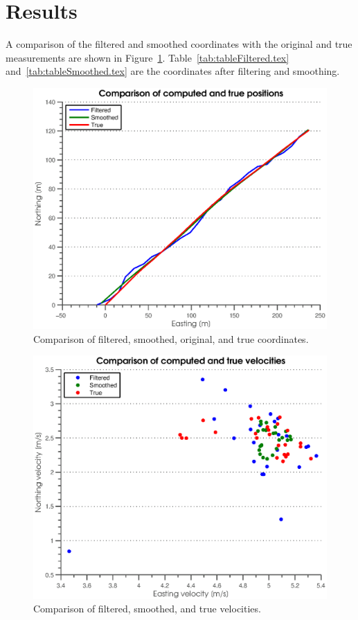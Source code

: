 

\section{Results} %
\label{sec:results}
A comparison of the filtered and smoothed coordinates with the original and true measurements are shown in Figure~\ref{fig:Figures_xDataPlots}. Table~\ref{tab:tableFiltered.tex} and~\ref{tab:tableSmoothed.tex} are the coordinates after filtering and smoothing.
\begin{figure}[htbp]
	\centering
		\includegraphics[width=\MyWidth]{Figures/xDataPlots.eps}
	\caption{Comparison of filtered, smoothed, original, and true coordinates.}
	\label{fig:Figures_xDataPlots}
\end{figure} %
\begin{figure}[htbp]
	\centering
		\includegraphics[width=\MyWidth]{Figures/vDataPlots.eps}
	\caption{Comparison of filtered, smoothed, and true velocities.}
	\label{fig:Figures_vDataPlots}
\end{figure} %
